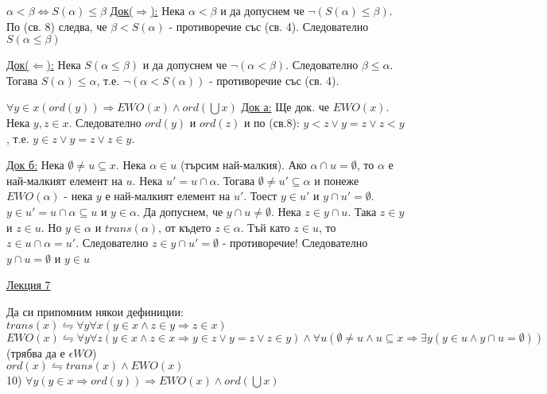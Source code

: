\documentclass[fleqn, titlepage, 12pt]{report}
\begin{document}
 $ \alpha < \beta \Leftrightarrow S(\alpha) \leq \beta$
\bigbreak
\underline{Док($ \Rightarrow $):} Нека $ \alpha < \beta$ и да допуснем че $ \lnot (S(\alpha) \leq \beta) $. По (св. 8)
следва, че $ \beta < S(\alpha) $ - противоречие със (св. 4). Следователно $ S( \alpha \leq \beta) $
\bigbreak

\underline{Док($ \Leftarrow $):} Нека $ S(\alpha \leq \beta) $ и да допуснем че $ \lnot (\alpha < \beta) $.
Следователно $ \beta \leq \alpha $. Тогава $ S(\alpha) \leq \alpha $, т.е. $ \lnot (\alpha < S(\alpha)) $ - противоречие
със (св. 4).

\bigbreak

 $ \forall{y \in x}(ord(y)) \Rightarrow EWO(x) \land ord(\bigcup x)$
\bigbreak
\underline{Док а:} Ще док. че $ EWO(x) $. Нека $ y,z \in x $. Следователно $ ord(y) $ и $ ord(z) $ и по (св.8):
$ y < z \lor y = z \lor z < y $, т.е. $ y \in z \lor y = z \lor z \in y $.
\bigbreak

\underline{Док б:} Нека $ \emptyset \neq u \subseteq x $. Нека $ \alpha \in u $ (търсим най-малкия).
Ако $ \alpha \cap u = \emptyset $, то $ \alpha $ е най-малкият елемент на $ u $. Нека $ u' = u \cap \alpha $.
Тогава $ \emptyset \neq u' \subseteq \alpha $ и понеже $ EWO(\alpha) $ - нека $ y $ е най-малкият елемент на $ u' $.
Тоест $ y \in u' $ и $ y \cap u' = \emptyset $. $ y \in u' = u \cap \alpha \subseteq u $ и $ y \in \alpha $.
Да допуснем, че $ y \cap u \neq \emptyset $. Нека $ z \in y \cap u $. Така $ z \in y $ и $ z \in u $. Но $ y \in \alpha $
и $ trans(\alpha)$, от където $ z \in \alpha $. Тъй като $ z \in u $, то $ z \in u \cap \alpha = u' $.
Следователно $ z \in y \cap u' = \emptyset $ - противоречие! Следователно $ y \cap u = \emptyset $ и $ y \in u $

\clearpage
\begin{center}
  \underline{\huge\normalfont Лекция 7}
\end{center}
\bigbreak

Да си припомним някои дефиниции:
\bigbreak
$ trans(x) \leftrightharpoons \forall{y}\forall{x}(y \in x \land z \in y \Rightarrow z \in x) $\\
$ EWO(x) \leftrightharpoons \forall{y}\forall{z}(y \in x \land z \in x \Rightarrow y \in z \lor y = z \lor z \in y )
\land \forall{u}(\emptyset \neq u \land u \subseteq x \Rightarrow \exists{y} (y \in u \land y \cap u = \emptyset))$
(трябва да е $ \epsilon WO $)\\
$ ord(x) \leftrightharpoons trans(x) \land EWO(x) $\\
10) $ \forall{y} (y \in x \Rightarrow ord(y)) \Rightarrow EWO(x) \land ord(\bigcup x)$
\end{document}
